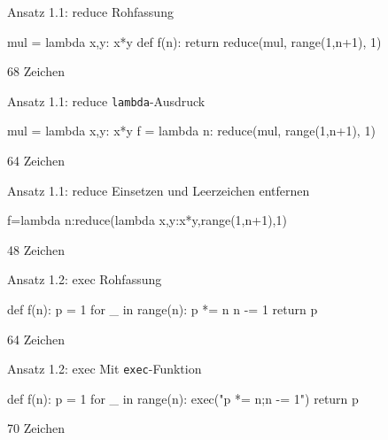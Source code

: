 \documentclass[xcolor=dvipsnames, aspectratio=43, 14pt]{beamer}
\begin{document}
\begin{frame}[fragile]{Ansatz 1.1: reduce}
	Rohfassung
	
	\vfill
	
	\begin{python3code}
	mul = lambda x,y: x*y
	def f(n):
	   return reduce(mul, range(1,n+1), 1)
	\end{python3code}
	
	\vfill
	
	68 Zeichen
\end{frame}

\begin{frame}[fragile]{Ansatz 1.1: reduce}
	\texttt{lambda}-Ausdruck
	
	\vfill
	
	\begin{python3code}
	mul = lambda x,y: x*y
	f = lambda n: reduce(mul, range(1,n+1), 1)
	\end{python3code}
	
	\vfill
	
	64 Zeichen
\end{frame}

\begin{frame}[fragile]{Ansatz 1.1: reduce}
	Einsetzen und Leerzeichen entfernen
	
	\vfill
	
	\begin{python3code}
	f=lambda n:reduce(lambda x,y:x*y,range(1,n+1),1)
	\end{python3code}
	
	\vfill
	
	48 Zeichen
\end{frame}

\begin{frame}[fragile]{Ansatz 1.2: exec}
	Rohfassung
	
	\vfill
	
	\begin{python3code}
	def f(n):
	   p = 1
	   for _ in range(n):
	      p *= n
	      n -= 1
	   return p
	\end{python3code}
	
	\vfill
	
	64 Zeichen
\end{frame}

\begin{frame}[fragile]{Ansatz 1.2: exec}
	Mit \texttt{exec}-Funktion
	
	\vfill
	
	\begin{python3code}
	def f(n):
	   p = 1
	   for _ in range(n):
	      exec("p *= n;n -= 1")
	   return p
	\end{python3code}
	
	\vfill
	
	70 Zeichen
\end{frame}
\end{document}
